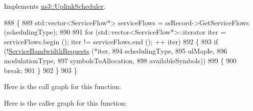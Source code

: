 Implements \hyperlink{classns3_1_1UplinkScheduler_ae6bbcbf3cae55770d0f100692e8af16b}{ns3\+::\+Uplink\+Scheduler}.


\begin{DoxyCode}
888 \{
889   std::vector<ServiceFlow*> serviceFlows = ssRecord->GetServiceFlows (schedulingType);
890 
891   \textcolor{keywordflow}{for} (std::vector<ServiceFlow*>::iterator iter = serviceFlows.begin (); iter != serviceFlows.end (); ++
      iter)
892     \{
893       \textcolor{keywordflow}{if} (!\hyperlink{classns3_1_1UplinkSchedulerMBQoS_a2405968bd60de182ce1e3d67ae416ba7}{ServiceBandwidthRequests} (*iter,
894                                      schedulingType,
895                                      ulMapIe,
896                                      modulationType,
897                                      symbolsToAllocation,
898                                      availableSymbols))
899         \{
900           \textcolor{keywordflow}{break};
901         \}
902     \}
903 \}
\end{DoxyCode}


Here is the call graph for this function\+:




Here is the caller graph for this function\+:



